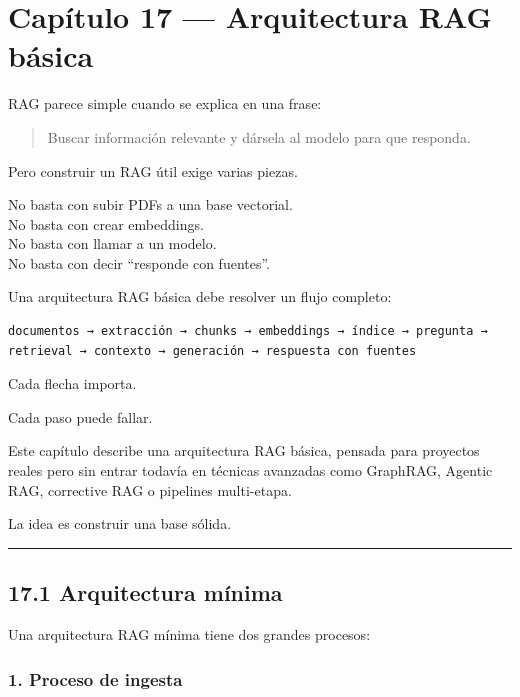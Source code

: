\newpage

\chapter{Capítulo 17 --- Arquitectura RAG
básica}\label{capuxedtulo-17-arquitectura-rag-buxe1sica}

RAG parece simple cuando se explica en una frase:

\begin{quote}
Buscar información relevante y dársela al modelo para que responda.
\end{quote}

Pero construir un RAG útil exige varias piezas.

No basta con subir PDFs a una base vectorial.\\
No basta con crear embeddings.\\
No basta con llamar a un modelo.\\
No basta con decir ``responde con fuentes''.

Una arquitectura RAG básica debe resolver un flujo completo:

\begin{lstlisting}
documentos → extracción → chunks → embeddings → índice → pregunta → retrieval → contexto → generación → respuesta con fuentes
\end{lstlisting}

Cada flecha importa.

Cada paso puede fallar.

Este capítulo describe una arquitectura RAG básica, pensada para
proyectos reales pero sin entrar todavía en técnicas avanzadas como
GraphRAG, Agentic RAG, corrective RAG o pipelines multi-etapa.

La idea es construir una base sólida.

\begin{center}\rule{0.5\linewidth}{0.5pt}\end{center}

\section{17.1 Arquitectura mínima}\label{arquitectura-muxednima}

Una arquitectura RAG mínima tiene dos grandes procesos:

\subsection{1. Proceso de ingesta}\label{proceso-de-ingesta}

